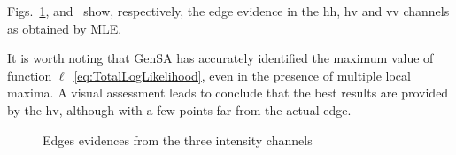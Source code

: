 \documentclass[journal]{IEEEtran}
\begin{document}

Figs.~\ref{evidencias_hh_hv_vv},  and~ show, respectively, the edge evidence in the $\text{hh}$, $\text{hv}$ and $\text{vv}$ channels as obtained by MLE.

It is worth noting that GenSA has accurately identified the maximum value of function $\ell$~\eqref{eq:TotalLogLikelihood}, even in the presence of multiple local maxima. 
A visual assessment leads to conclude that the best results are provided by the $\text{hv}$, although with a few points far from the actual edge.

   \begin{figure}[hbt]
	\centering
     \caption{Edges evidences from the three intensity channels}
     \label{evidencias_hh_hv_vv} 
   \end{figure}
\end{document}
